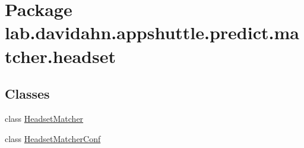 \hypertarget{namespacelab_1_1davidahn_1_1appshuttle_1_1predict_1_1matcher_1_1headset}{\section{\-Package lab.\-davidahn.\-appshuttle.\-predict.\-matcher.\-headset}
\label{namespacelab_1_1davidahn_1_1appshuttle_1_1predict_1_1matcher_1_1headset}
}
\subsection*{\-Classes}
\begin{DoxyCompactItemize}
\item 
class \hyperlink{classlab_1_1davidahn_1_1appshuttle_1_1predict_1_1matcher_1_1headset_1_1_headset_matcher}{\-Headset\-Matcher}
\item 
class \hyperlink{classlab_1_1davidahn_1_1appshuttle_1_1predict_1_1matcher_1_1headset_1_1_headset_matcher_conf}{\-Headset\-Matcher\-Conf}
\end{DoxyCompactItemize}
